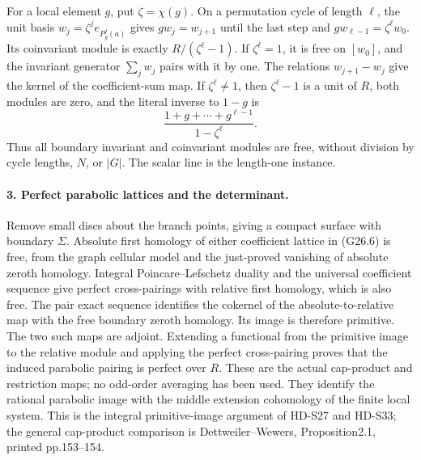 For a local element \(g\), put \(\zeta=\chi(g)\).
On a permutation cycle of length \(\ell\), the unit basis
\(w_j=\zeta^je_{P_g^j(a)}\) gives
\(gw_j=w_{j+1}\) until the last step and
\(gw_{\ell-1}=\zeta^\ell w_0\). Its coinvariant module is
exactly \(R/(\zeta^\ell-1)\). If \(\zeta^\ell=1\),
it is free on \([w_0]\), and the invariant generator
\(\sum_jw_j\) pairs with it by one. The relations
\(w_{j+1}-w_j\) give the kernel of the coefficient-sum map.
If \(\zeta^\ell\ne1\), then \(\zeta^\ell-1\) is a unit
of \(R\), both modules are zero, and the literal inverse
to \(1-g\) is
\[
                     \frac{1+g+\cdots+g^{\ell-1}}
                                  {1-\zeta^\ell}.
                                                               \tag{G26.7}
\]
Thus all boundary invariant and coinvariant modules are free,
without division by cycle lengths, \(N\), or \(|G|\).
The scalar line is the length-one instance.

\paragraph{3. Perfect parabolic lattices and the determinant.}
Remove small discs about the branch points, giving a compact
surface with boundary \(\Sigma\). Absolute first homology of
either coefficient lattice in (G26.6) is free, from the graph
cellular model and the just-proved vanishing of absolute zeroth
homology. Integral Poincare--Lefschetz duality and the universal
coefficient sequence give perfect cross-pairings with relative
first homology, which is also free. The pair exact sequence
identifies the cokernel of the absolute-to-relative map with
the free boundary zeroth homology. Its image is therefore
primitive. The two such maps are adjoint. Extending a functional
from the primitive image to the relative module and applying
the perfect cross-pairing proves that the induced parabolic
pairing is perfect over \(R\). These are the actual cap-product
and restriction maps; no odd-order averaging has been used.
They identify the rational parabolic image with the middle
extension cohomology of the finite local system.
This is the integral primitive-image argument of HD-S27 and
HD-S33; the general cap-product comparison is
Dettweiler--Wewers, Proposition2.1, printed pp.153--154.

